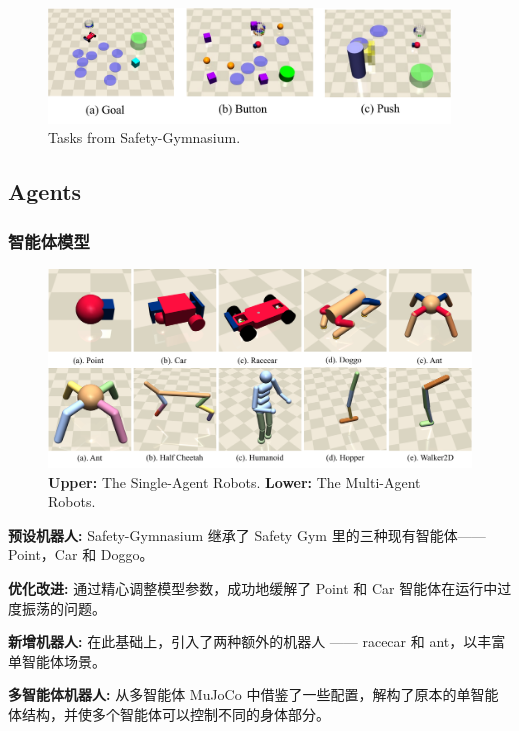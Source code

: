 \documentclass[10pt,mathserif]{beamer}%
\begin{document}
\begin{frame}[t, fragile]
\begin{minipage}[bp]{\textwidth}
\begin{figure}
  \centering
  \includegraphics[width=0.95\textwidth]{images/task.pdf}
  \vspace*{-0.8\baselineskip}
  \caption{Tasks from Safety-Gymnasium.}
  \label{fig:task}
\end{figure}

\end{minipage}

\end{frame}
\subsection{Agents}
\begin{frame}[t,fragile]
    \frametitle{智能体模型}
\begin{figure}[ht]
  \centering
  \includegraphics[width=0.9\linewidth]{Safety-Gymnasium/assets/main-paper/agent.pdf}
  \caption{\textbf{Upper: }The Single-Agent Robots. \textbf{Lower:} The Multi-Agent Robots.}
  \label{pic:agent}
\end{figure}
\vspace{-0.5cm}
\begin{itemize}
{
\fontsize{8pt}{9.6pt}\selectfont
    \item \textbf{预设机器人:} Safety-Gymnasium 继承了 Safety Gym 里的三种现有智能体——Point，Car 和 Doggo。
    \item \textbf{优化改进:} 通过精心调整模型参数，成功地缓解了 Point 和 Car 智能体在运行中过度振荡的问题。
    \item \textbf{新增机器人:} 在此基础上，引入了两种额外的机器人 —— racecar 和 ant，以丰富单智能体场景。
    \item \textbf{多智能体机器人:} 从多智能体 MuJoCo 中借鉴了一些配置，解构了原本的单智能体结构，并使多个智能体可以控制不同的身体部分。
}
\end{itemize}
\end{frame}
\end{document}
